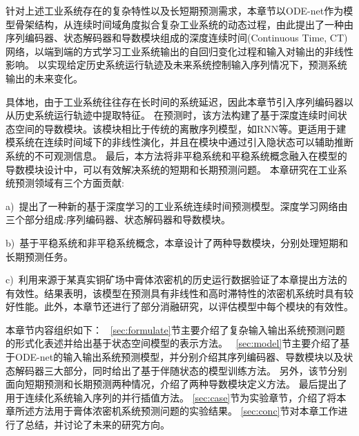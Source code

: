 针对上述工业系统存在的复杂特性以及长短期预测需求，本章节以ODE-net作为模型骨架结构，从连续时间域角度拟合复杂工业系统的动态过程，由此提出了一种由序列编码器、状态解码器和导数模块组成的深度连续时间(Continuous Time, CT)网络，以端到端的方式学习工业系统输出的自回归变化过程和输入对输出的非线性影响。
以实现给定历史系统运行轨迹及未来系统控制输入序列情况下，预测系统输出的未来变化。

具体地，由于工业系统往往存在长时间的系统延迟，因此本章节引入序列编码器以从历史系统运行轨迹中提取特征。
在预测时，该方法构建了基于深度连续时间状态空间的导数模块。该模块相比于传统的离散序列模型，如RNN等。更适用于建模系统在连续时间域下的非线性演化，并且在模块中通过引入隐状态可以辅助推断系统的不可观测信息。
最后，本方法将非平稳系统和平稳系统概念融入在模型的导数模块设计中，可以有效解决系统的短期和长期预测问题。
本章研究在工业系统预测领域有三个方面贡献:

a)\ 提出了一种新的基于深度学习的工业系统连续时间预测模型。深度学习网络由三个部分组成:序列编码器、状态解码器和导数模块。

b)\ 基于平稳系统和非平稳系统概念，本章设计了两种导数模块，分别处理短期和长期预测任务。

c)\ 利用来源于某真实铜矿场中膏体浓密机的历史运行数据验证了本章提出方法的有效性。结果表明，该模型在预测具有非线性和高时滞特性的浓密机系统时具有较好性能。此外，本章节还进行了部分消融研究，以评估模型中每个模块的有效性。

本章节内容组织如下：
~\ref{sec:formulate}节主要介绍了复杂输入输出系统预测问题的形式化表述并给出基于状态空间模型的表示方法。
~\ref{sec:model}节主要介绍了基于ODE-net的输入输出系统预测模型，并分别介绍其序列编码器、导数模块以及状态解码器三大部分，同时给出了基于伴随状态的模型训练方法。
另外，该节分别面向短期预测和长期预测两种情况，介绍了两种导数模块定义方法。
最后提出了用于连续化系统输入序列的并行插值方法。
\ref{sec:case}节为实验章节，介绍了将本章所述方法用于膏体浓密机系统预测问题的实验结果。
\ref{sec:conc}节对本章工作进行了总结，并讨论了未来的研究方向。

